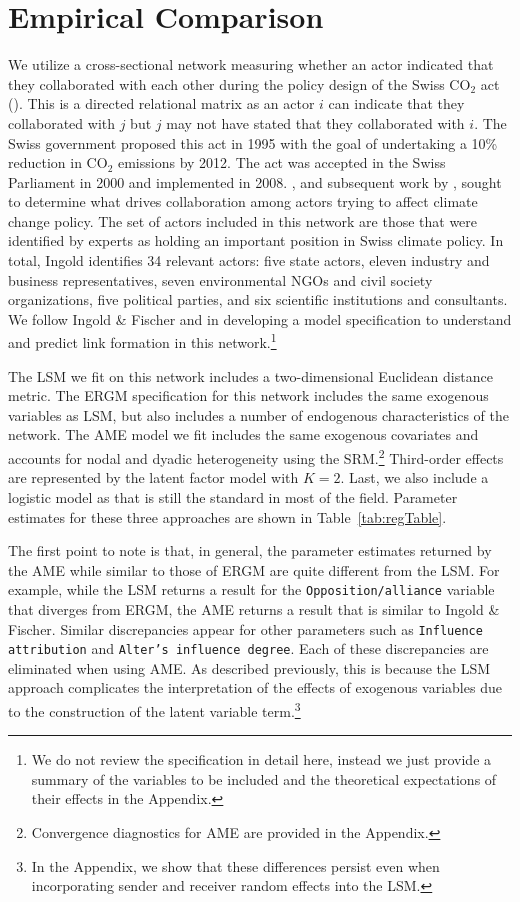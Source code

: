 \section*{\textbf{Empirical Comparison}}

We utilize a cross-sectional network measuring whether an actor indicated that they collaborated with each other during the policy design of the Swiss CO$_{2}$ act (\citealt{ingold:2008}). This is a directed relational matrix as an actor $i$ can indicate that they collaborated with $j$ but $j$ may not have stated that they collaborated with $i$. The Swiss government proposed this act in 1995 with the goal of undertaking a 10\% reduction in CO$_{2}$ emissions by 2012. The act was accepted in the Swiss Parliament in 2000 and implemented in 2008. \citet{ingold:2008}, and subsequent work by \citet{ingold:fischer:2014}, sought to determine what drives collaboration among actors trying to affect climate change policy. The set of actors included in this network are those that were identified by experts as holding an important position in Swiss climate policy. In total, Ingold identifies 34 relevant actors: five state actors, eleven industry and business representatives, seven environmental NGOs and civil society organizations, five political parties, and six scientific institutions and consultants. We follow Ingold \& Fischer and \citet{cranmer:etal:2016} in developing a model specification to understand and predict link formation in this network.\footnote{We do not review the specification in detail here, instead we just provide a summary of the variables to be included and the theoretical expectations of their effects in the Appendix.}

The LSM we fit on this network includes a two-dimensional Euclidean distance metric. The ERGM specification for this network includes the same exogenous variables as LSM, but also includes a number of endogenous characteristics of the network. The AME model we fit includes the same exogenous covariates and accounts for nodal and dyadic heterogeneity using the SRM.\footnote{Convergence diagnostics for AME are provided in the Appendix.} Third-order effects are represented by the latent factor model with $K=2$. Last, we also include a logistic model as that is still the standard in most of the field. Parameter estimates for these three approaches are shown in Table~\ref{tab:regTable}.

The first point to note is that, in general, the parameter estimates returned by the AME while similar to those of ERGM are quite different from the LSM. For example, while the LSM returns a result for the \texttt{Opposition/alliance} variable that diverges from ERGM, the AME returns a result that is similar to Ingold \& Fischer. Similar discrepancies appear for other parameters such as \texttt{Influence attribution} and \texttt{Alter's influence degree}. Each of these discrepancies are eliminated when using AME. As described previously, this is because the LSM approach complicates the interpretation of the effects of exogenous variables due to the construction of the latent variable term.\footnote{In the Appendix, we show that these differences persist even when incorporating sender and receiver random effects into the LSM.}

